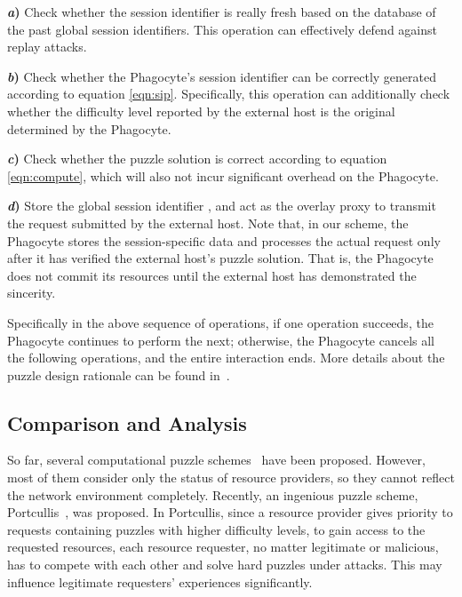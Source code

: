 \documentclass[times,10pt,twocolumn]{article}
\begin{document}
\textbf{\emph{a})} Check whether the session identifier  is really fresh based on the database of the
past global session identifiers. This operation can effectively
defend against replay attacks.


\textbf{\emph{b})} Check whether the Phagocyte's session identifier
 can be correctly generated according to equation
\ref{eqn:sip}. Specifically, this operation can additionally check
whether the difficulty level  reported by the external host is
the original  determined by the Phagocyte.


\textbf{\emph{c})} Check whether the puzzle solution is correct
according to equation \ref{eqn:compute}, which will also not incur
significant overhead on the Phagocyte.


\textbf{\emph{d})} Store the global session identifier , and act as the overlay proxy to transmit the
request submitted by the external host. Note that, in our scheme,
the Phagocyte stores the session-specific data and processes the
actual request only after it has verified the external host's puzzle
solution. That is, the Phagocyte does not commit its resources until
the external host has demonstrated the sincerity.




Specifically in the above sequence of operations, if one operation
succeeds, the Phagocyte continues to perform the next; otherwise,
the Phagocyte cancels all the following operations, and the entire
interaction ends. More details about the puzzle design rationale can
be found in~\cite{puzzle-Chen09}.



\subsection{Comparison and Analysis}


So far, several computational puzzle
schemes~\cite{DworkN92,JuelsB99,Merkle78} have been proposed.
However, most of them consider only the status of resource
providers, so they cannot reflect the network environment
completely. Recently, an ingenious puzzle scheme,
Portcullis~\cite{ParnoWSPMH07}, was proposed. In Portcullis, since a
resource provider gives priority to requests containing puzzles with
higher difficulty levels, to gain access to the requested resources,
each resource requester, no matter legitimate or malicious, has to
compete with each other and solve hard puzzles under attacks. This
may influence legitimate requesters' experiences significantly.
\end{document}
